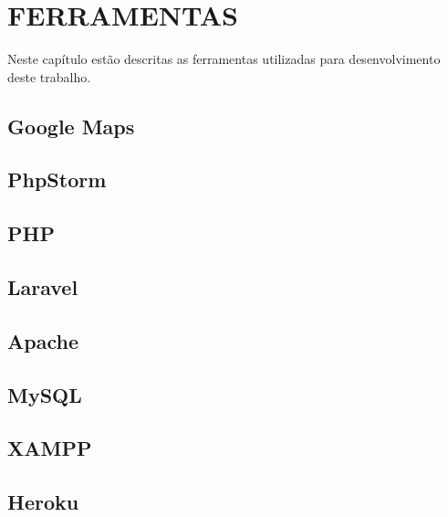 
\chapter{FERRAMENTAS}
Neste capítulo estão descritas as ferramentas utilizadas para desenvolvimento deste
trabalho.

\section{Google Maps}

\section{PhpStorm}

\section{PHP}

\section{Laravel}

\section{Apache}

\section{MySQL}

\section{XAMPP}

\section{Heroku}
